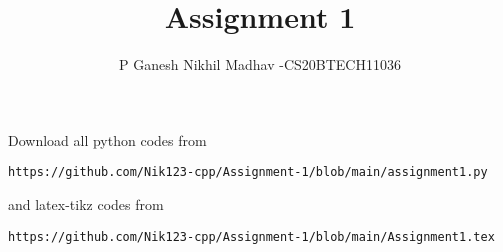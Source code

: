 \documentclass[journal,12pt,twocolumn]{IEEEtran}
\begin{document}
     \def\rightbox#1{\makebox[0in][r]{#1}}
     \def\centbox#1{\makebox[0in]{#1}}
     \def\topbox#1{\raisebox{-\baselineskip}[0in][0in]{#1}}
     \def\midbox#1{\raisebox{-0.5\baselineskip}[0in][0in]{#1}}
\vspace{3cm}
\title{Assignment 1}
\author{P Ganesh Nikhil Madhav -CS20BTECH11036}
\maketitle
\newpage
\bigskip
\renewcommand{\thefigure}{\theenumi}
\renewcommand{\thetable}{\theenumi}
Download all python codes from 
\begin{lstlisting}
https://github.com/Nik123-cpp/Assignment-1/blob/main/assignment1.py
\end{lstlisting}
%
and latex-tikz codes from 
%
\begin{lstlisting}
https://github.com/Nik123-cpp/Assignment-1/blob/main/Assignment1.tex
\end{lstlisting}
\end{document}
